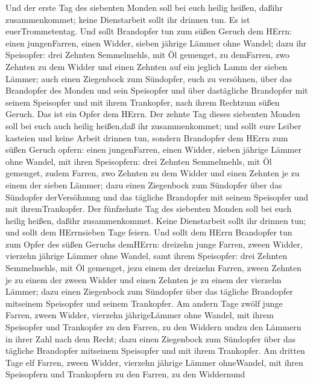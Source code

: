  Und der erste Tag des siebenten Monden soll bei euch heilig
heißen, daßihr zusammenkommet; keine Dienstarbeit sollt ihr drinnen tun.
Es ist euerTrommetentag.  Und sollt Brandopfer tun zum süßen
Geruch dem HErrn: einen jungenFarren, einen Widder, sieben jährige
Lämmer ohne Wandel;  dazu ihr Speisopfer: drei Zehnten
Semmelmehls, mit Öl gemenget, zu demFarren, zwo Zehnten zu dem Widder
 und einen Zehnten auf ein jeglich Lamm der sieben Lämmer;
 auch einen Ziegenbock zum Sündopfer, euch zu versöhnen,
 über das Brandopfer des Monden und sein Speisopfer und über
dastägliche Brandopfer mit seinem Speisopfer und mit ihrem Trankopfer,
nach ihrem Rechtzum süßen Geruch. Das ist ein Opfer dem HErrn.
 Der zehnte Tag dieses siebenten Monden soll bei euch auch
heilig heißen,daß ihr zusammenkommet; und sollt eure Leiber kasteien und
keine Arbeit drinnen tun,  sondern Brandopfer dem HErrn zum
süßen Geruch opfern: einen jungenFarren, einen Widder, sieben jährige
Lämmer ohne Wandel,  mit ihren Speisopfern: drei Zehnten
Semmelmehls, mit Öl gemenget, zudem Farren, zwo Zehnten zu dem Widder
 und einen Zehnten je zu einem der sieben Lämmer;
 dazu einen Ziegenbock zum Sündopfer über das Sündopfer
derVersöhnung und das tägliche Brandopfer mit seinem Speisopfer und mit
ihremTrankopfer.  Der fünfzehnte Tag des siebenten Monden
soll bei euch heilig heißen, daßihr zusammenkommet. Keine Dienstarbeit
sollt ihr drinnen tun; und sollt dem HErrnsieben Tage feiern.
 Und sollt dem HErrn Brandopfer tun zum Opfer des süßen
Geruchs demHErrn: dreizehn junge Farren, zween Widder, vierzehn jährige
Lämmer ohne Wandel,  samt ihrem Speisopfer: drei Zehnten
Semmelmehls, mit Öl gemenget, jezu einem der dreizehn Farren, zween
Zehnten je zu einem der zween Widder  und einen Zehnten je
zu einem der vierzehn Lämmer;  dazu einen Ziegenbock zum
Sündopfer über das tägliche Brandopfer mitseinem Speisopfer und seinem
Trankopfer.  Am andern Tage zwölf junge Farren, zween
Widder, vierzehn jährigeLämmer ohne Wandel,  mit ihrem
Speisopfer und Trankopfer zu den Farren, zu den Widdern undzu den
Lämmern in ihrer Zahl nach dem Recht;  dazu einen
Ziegenbock zum Sündopfer über das tägliche Brandopfer mitseinem
Speisopfer und mit ihrem Trankopfer.  Am dritten Tage elf
Farren, zween Widder, vierzehn jährige Lämmer ohneWandel, 
mit ihren Speisopfern und Trankopfern zu den Farren, zu den Widdernund
